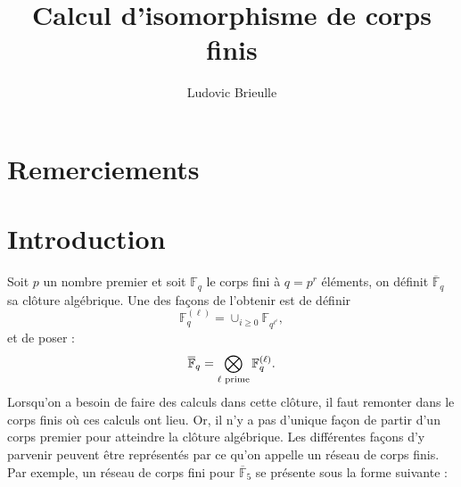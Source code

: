 \documentclass[a4paper]{article} %
\numberwithin{section}{part}
\numberwithin{equation}{section}
\newcommand\GF[1]{\mathbb{F}_{#1}}
\begin{document}
\title{Calcul d'isomorphisme de corps finis}
\author{Ludovic Brieulle}
\newtheorem{thm}{Théorème}[section]
\newtheorem{lem}[thm]{Lemme}
\newtheorem{cor}[thm]{Corollaire}
\newtheorem{prop}[thm]{Proposition}
\theoremstyle{definition}
\newtheorem{defn}[thm]{Définition}
\newtheorem{defnp}[thm]{Définition et proposition}
\newtheorem*{ex}{Exemple}
\theoremstyle{remark}
\newtheorem*{rem}{Remarque}

\maketitle
\part*{Remerciements}

\part*{Introduction}
Soit $p$ un nombre premier et soit $\GF{q}$ le corps fini à $q = p^r$ éléments, 
on définit $\overline{\mathbb{F}}_q$ sa clôture algébrique. Une des façons
de l'obtenir est de définir 
\[\GF{q}^{(\ell)} = \cup_{i\geq0}{\GF{q^{\ell^i}}},\] 
et de poser :
\[\overline{\mathbb{F}}_q = \bigotimes_{\ell\textup{ prime}}{\GF{q}^{(\ell)}}.\]
Lorsqu'on a besoin de faire des calculs dans cette clôture, il faut remonter
dans le corps finis où ces calculs ont lieu. Or, il n'y a pas d'unique façon de
partir d'un corps premier pour \og atteindre\fg{} la clôture algébrique. Les
différentes façons d'y parvenir peuvent être représentés par ce qu'on appelle 
un réseau de corps finis. Par exemple, un réseau de corps fini pour 
$\overline{\mathbb{F}}_5$ se présente sous la forme suivante :

\begin{center}
\end{center}
\end{document}

